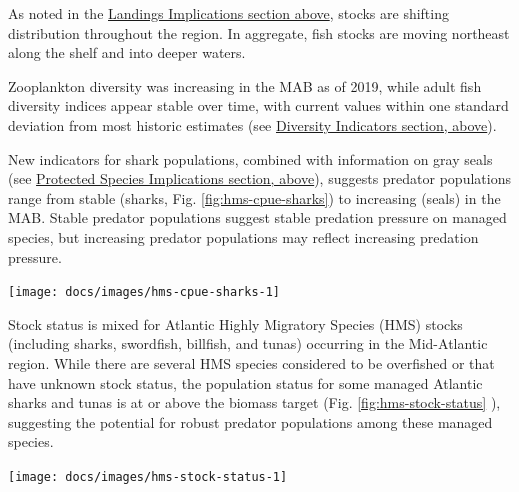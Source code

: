 \documentclass[
  10pt,
]{article}
\let\origfigure\figure
\let\endorigfigure\endfigure
\renewenvironment{figure}[1][2] {
    \expandafter\origfigure\expandafter[H]
} {
    \endorigfigure
}
\begin{document}
As noted in the \protect\hyperlink{implications}{Landings Implications
section above}, stocks are shifting distribution throughout the region.
In aggregate, fish stocks are moving northeast along the shelf and into
deeper waters.

Zooplankton diversity was increasing in the MAB as of 2019, while adult
fish diversity indices appear stable over time, with current values
within one standard deviation from most historic estimates (see
\protect\hyperlink{ecological-diversity}{Diversity Indicators section,
above}).

New indicators for shark populations, combined with information on gray
seals (see \protect\hyperlink{protected-species}{Protected Species
Implications section, above}), suggests predator populations range from
stable (sharks, Fig. \ref{fig:hms-cpue-sharks}) to increasing (seals) in
the MAB. Stable predator populations suggest stable predation pressure
on managed species, but increasing predator populations may reflect
increasing predation pressure.

\begin{figure}

{\centering \texttt{[image: docs/images/hms-cpue-sharks-1]} 

}

\caption{Estimated number of sharks per unit effort from Highly Migratory Species Pelagic Observer Program data.}\label{fig:hms-cpue-sharks}
\end{figure}

Stock status is mixed for Atlantic Highly Migratory Species (HMS) stocks
(including sharks, swordfish, billfish, and tunas) occurring in the
Mid-Atlantic region. While there are several HMS species considered to
be overfished or that have unknown stock status, the population status
for some managed Atlantic sharks and tunas is at or above the biomass
target (Fig. \ref{fig:hms-stock-status} ), suggesting the potential for
robust predator populations among these managed species.

\begin{figure}

{\centering \texttt{[image: docs/images/hms-stock-status-1]} 

}

\caption{Summary of single species status for HMS stocks; key to species names at https://noaa-edab.github.io/tech-doc/atlantic-highly-migratory-species-stock-status.html.}\label{fig:hms-stock-status}
\end{figure}
\end{document}
